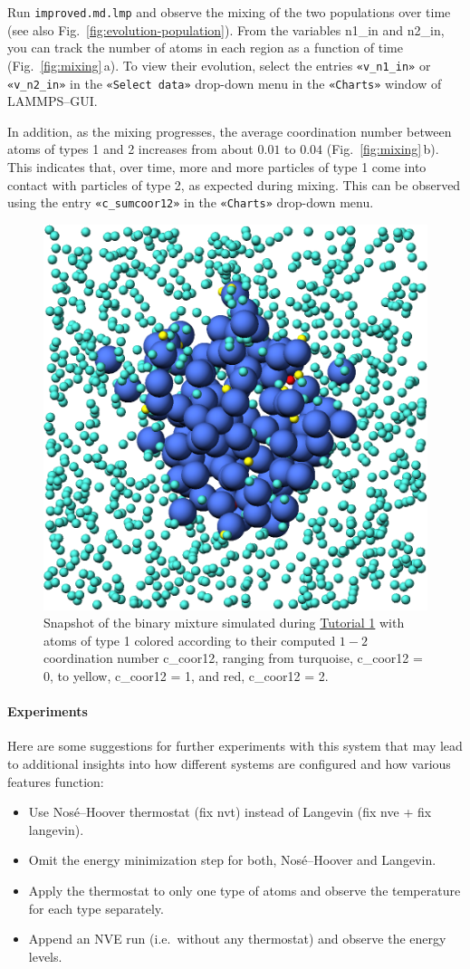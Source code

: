 \documentclass[9pt,tutorial]{livecoms}
\newcommand{\lmpcmd}[1]{\hspace{0pt}\colorbox{listing}{\textcolor{command}{\small{#1}}}\hspace{0pt}} %
\newcommand{\flecmd}[1]{\textcolor{command}{\texttt{#1}}} %
\newcommand{\guicmd}[1]{\textcolor{command}{\texttt{«#1»}}} %
\begin{document}
Run \flecmd{improved.md.lmp} and observe the mixing of the two populations
over time (see also Fig.~\ref{fig:evolution-population}).  From the
variables \lmpcmd{n1\_in} and \lmpcmd{n2\_in}, you can track the number
of atoms in each region as a function of time
(Fig.~\ref{fig:mixing}\,a).  To view their evolution, select the entries
\guicmd{v\_n1\_in} or \guicmd{v\_n2\_in} in the \guicmd{Select data} drop-down
menu in the \guicmd{Charts} window of LAMMPS--GUI.

In addition, as the mixing progresses, the average coordination number
between atoms of types 1 and 2 increases from about $0.01$ to $0.04$
(Fig.~\ref{fig:mixing}\,b).  This indicates that, over time, more and
more particles of type 1 come into contact with particles of type 2, as
expected during mixing.  This can be observed using the entry
\guicmd{c\_sumcoor12} in the \guicmd{Charts} drop-down menu.

\begin{figure}
\centering
\includegraphics[width=0.55\linewidth]{LJ-coords}
\caption{Snapshot of the binary mixture simulated
  during \hyperref[lennard-jones-label]{Tutorial 1} with atoms of type 1
  colored according to their computed $1-2$ coordination
  number \lmpcmd{c\_coor12}, ranging from turquoise, \lmpcmd{c\_coor12 = 0},
  to yellow, \lmpcmd{c\_coor12 = 1}, and red, \lmpcmd{c\_coor12 = 2}.}
\label{fig:coords-viz}
\end{figure}

\paragraph{Experiments}

Here are some suggestions for further experiments with this system that
may lead to additional insights into how different systems are configured
and how various features function:
\begin{itemize}
\item Use Nos\'e--Hoover thermostat (\lmpcmd{fix nvt}) instead of Langevin
  (\lmpcmd{fix nve} + \lmpcmd{fix langevin}).
\item Omit the energy minimization step for both, Nos\'e--Hoover and Langevin.
\item Apply the thermostat to only one type of atoms and observe the
  temperature for each type separately.
\item Append an NVE run (i.e.~without any thermostat) and observe the energy levels.
\end{itemize}
\end{document}
